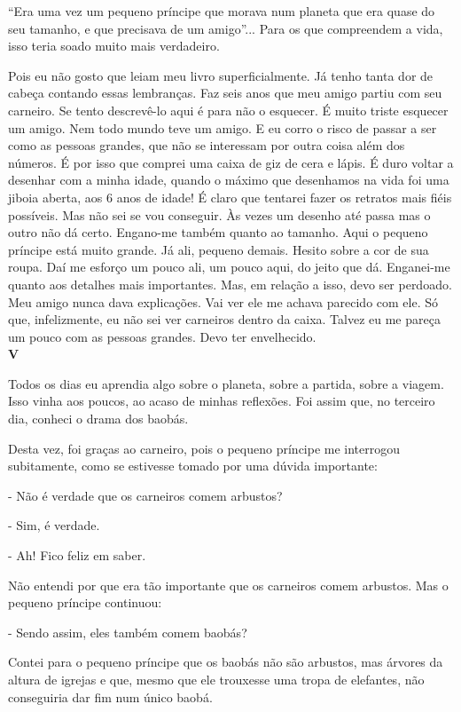 \begin{Parallel}[p]{}{}
{``Era uma vez um pequeno príncipe que morava num planeta que era quase
do seu tamanho, e que precisava de um amigo''... Para os que compreendem
a vida, isso teria soado muito mais verdadeiro.

Pois eu não gosto que leiam meu livro superficialmente. Já tenho tanta
dor de cabeça contando essas lembranças. Faz seis anos que meu amigo
partiu com seu carneiro. Se tento descrevê-lo aqui é para não o
esquecer. É muito triste esquecer um amigo. Nem todo mundo teve um
amigo. E eu corro o risco de passar a ser como as pessoas grandes, que
não se interessam por outra coisa além dos números. É por isso que
comprei uma caixa de giz de cera e lápis. É duro voltar a desenhar com a
minha idade, quando o máximo que desenhamos na vida foi uma jiboia
aberta, aos 6 anos de idade! É claro que tentarei fazer os retratos mais
fiéis possíveis. Mas não sei se vou conseguir. Às vezes um desenho até
passa mas o outro não dá certo. Engano-me também quanto ao tamanho. Aqui
o pequeno príncipe está muito grande. Já ali, pequeno demais. Hesito
sobre a cor de sua roupa. Daí me esforço um pouco ali, um pouco aqui, do
jeito que dá. Enganei-me quanto aos detalhes mais importantes. Mas, em
relação a isso, devo ser perdoado. Meu amigo nunca dava explicações. Vai
ver ele me achava parecido com ele. Só que, infelizmente, eu não sei ver
carneiros dentro da caixa. Talvez eu me pareça um pouco com as pessoas
grandes. Devo ter envelhecido. \\

\textbf{V}

Todos os dias eu aprendia algo sobre o planeta, sobre a partida, sobre a
viagem. Isso vinha aos poucos, ao acaso de minhas reflexões. Foi assim
que, no terceiro dia, conheci o drama dos baobás.

Desta vez, foi graças ao carneiro, pois o pequeno príncipe me interrogou
subitamente, como se estivesse tomado por uma dúvida importante:

- Não é verdade que os carneiros comem arbustos?

- Sim, é verdade.

- Ah! Fico feliz em saber.

Não entendi por que era tão importante que os carneiros comem arbustos.
Mas o pequeno príncipe continuou:

- Sendo assim, eles também comem baobás?

Contei para o pequeno príncipe que os baobás não são arbustos, mas
árvores da altura de igrejas e que, mesmo que ele trouxesse uma tropa de
elefantes, não conseguiria dar fim num único baobá.

}
\end{Parallel}
